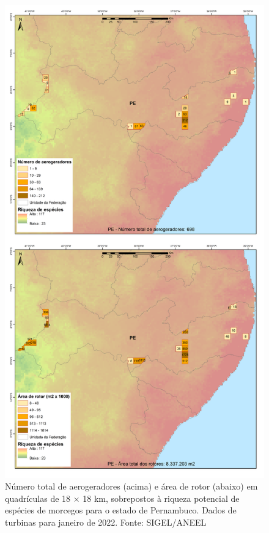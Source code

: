 \documentclass[
  oneside]{scrbook}
\begin{document}
\begin{figure}[H]

{\centering \includegraphics[width=0.7\linewidth]{imagens/cap09/Figura_9.10} 

}

\caption{Número total de aerogeradores (acima) e área de rotor (abaixo) em quadrículas de 18 × 18 km, sobrepostos à riqueza potencial de espécies de morcegos para o estado de Pernambuco. Dados de turbinas para janeiro de 2022. Fonte: SIGEL/ANEEL}\label{fig:75}
\end{figure}
\end{document}
